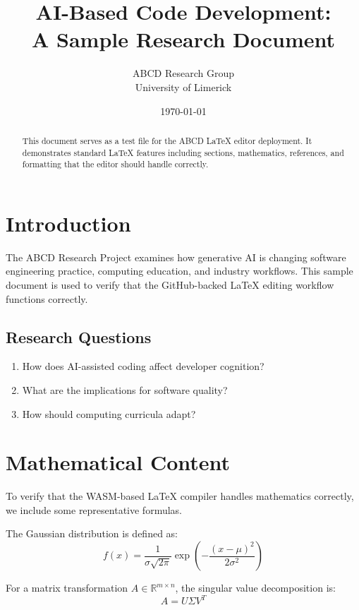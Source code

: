 \documentclass[12pt,a4paper]{article}
\title{AI-Based Code Development:\\A Sample Research Document}
\author{ABCD Research Group\\University of Limerick}
\date{\today}
\begin{document}
\maketitle

\begin{abstract}
This document serves as a test file for the ABCD LaTeX editor deployment.
It demonstrates standard LaTeX features including sections, mathematics,
references, and formatting that the editor should handle correctly.
\end{abstract}

\section{Introduction}

The ABCD Research Project examines how generative AI is changing software
engineering practice, computing education, and industry workflows. This
sample document is used to verify that the GitHub-backed LaTeX editing
workflow functions correctly.

\subsection{Research Questions}

\begin{enumerate}
    \item How does AI-assisted coding affect developer cognition?
    \item What are the implications for software quality?
    \item How should computing curricula adapt?
\end{enumerate}

\section{Mathematical Content}

To verify that the WASM-based LaTeX compiler handles mathematics correctly,
we include some representative formulas.

The Gaussian distribution is defined as:
\begin{equation}
    f(x) = \frac{1}{\sigma\sqrt{2\pi}} \exp\left(-\frac{(x-\mu)^2}{2\sigma^2}\right)
\end{equation}

For a matrix transformation $A \in \mathbb{R}^{m \times n}$, the singular
value decomposition is:
\begin{equation}
    A = U \Sigma V^T
\end{equation}
\end{document}
